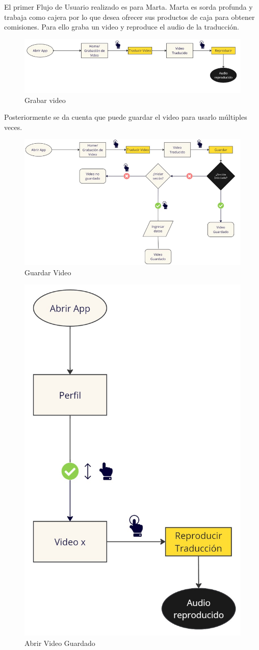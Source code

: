 El primer Flujo de Usuario realizado es para Marta. Marta es sorda profunda y trabaja como cajera por lo que desea ofrecer sus productos de caja para obtener comisiones. Para ello graba un video y reproduce el audio de la traducción. 

\begin{figure} [H]
    \centering
    \includegraphics[width=1\linewidth]{figuras/flujo_usuario1.png}
    \caption{Grabar video}
    \label{fig:enter-label}
\end{figure}

Posteriormente se da cuenta que puede guardar el video para usarlo múltiples veces.

\begin{figure}  [H]
    \centering
    \includegraphics[width=1\linewidth]{figuras/flujo_usuario2.png}
    \caption{Guardar Video}
    \label{fig:enter-label}
\end{figure}

\begin{figure} [H]
    \centering
    \includegraphics[width=0.3\linewidth]{figuras/flujo_usuario3.jpg}
    \caption{Abrir Video Guardado}
    \label{fig:enter-label}
\end{figure}


